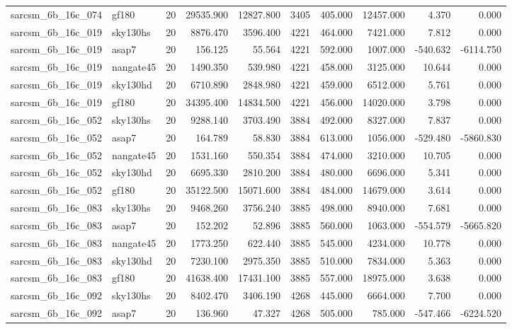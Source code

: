 \begin{tabular}{llrrrrrrrr}
sarcsm\_6b\_16c\_074 & gf180 & 20 & 29535.900 & 12827.800 & 3405 & 405.000 & 12457.000 & 4.370 & 0.000 \\
sarcsm\_6b\_16c\_019 & sky130hs & 20 & 8876.470 & 3596.400 & 4221 & 464.000 & 7421.000 & 7.812 & 0.000 \\
sarcsm\_6b\_16c\_019 & asap7 & 20 & 156.125 & 55.564 & 4221 & 592.000 & 1007.000 & -540.632 & -6114.750 \\
sarcsm\_6b\_16c\_019 & nangate45 & 20 & 1490.350 & 539.980 & 4221 & 458.000 & 3125.000 & 10.644 & 0.000 \\
sarcsm\_6b\_16c\_019 & sky130hd & 20 & 6710.890 & 2848.980 & 4221 & 459.000 & 6512.000 & 5.761 & 0.000 \\
sarcsm\_6b\_16c\_019 & gf180 & 20 & 34395.400 & 14834.500 & 4221 & 456.000 & 14020.000 & 3.798 & 0.000 \\
sarcsm\_6b\_16c\_052 & sky130hs & 20 & 9288.140 & 3703.490 & 3884 & 492.000 & 8327.000 & 7.837 & 0.000 \\
sarcsm\_6b\_16c\_052 & asap7 & 20 & 164.789 & 58.830 & 3884 & 613.000 & 1056.000 & -529.480 & -5860.830 \\
sarcsm\_6b\_16c\_052 & nangate45 & 20 & 1531.160 & 550.354 & 3884 & 474.000 & 3210.000 & 10.705 & 0.000 \\
sarcsm\_6b\_16c\_052 & sky130hd & 20 & 6695.330 & 2810.200 & 3884 & 480.000 & 6696.000 & 5.341 & 0.000 \\
sarcsm\_6b\_16c\_052 & gf180 & 20 & 35122.500 & 15071.600 & 3884 & 484.000 & 14679.000 & 3.614 & 0.000 \\
sarcsm\_6b\_16c\_083 & sky130hs & 20 & 9468.260 & 3756.240 & 3885 & 498.000 & 8940.000 & 7.681 & 0.000 \\
sarcsm\_6b\_16c\_083 & asap7 & 20 & 152.202 & 52.896 & 3885 & 560.000 & 1063.000 & -554.579 & -5665.820 \\
sarcsm\_6b\_16c\_083 & nangate45 & 20 & 1773.250 & 622.440 & 3885 & 545.000 & 4234.000 & 10.778 & 0.000 \\
sarcsm\_6b\_16c\_083 & sky130hd & 20 & 7230.100 & 2975.350 & 3885 & 510.000 & 7834.000 & 5.363 & 0.000 \\
sarcsm\_6b\_16c\_083 & gf180 & 20 & 41638.400 & 17431.100 & 3885 & 557.000 & 18975.000 & 3.638 & 0.000 \\
sarcsm\_6b\_16c\_092 & sky130hs & 20 & 8402.470 & 3406.190 & 4268 & 445.000 & 6664.000 & 7.700 & 0.000 \\
sarcsm\_6b\_16c\_092 & asap7 & 20 & 136.960 & 47.327 & 4268 & 505.000 & 785.000 & -547.466 & -6224.520 \\

\end{tabular}
